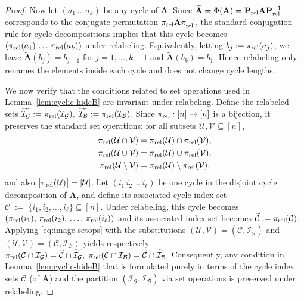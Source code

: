 \documentclass[onecolumn]{IEEEtran} %
\newcommand{\bA}{\mathbf A}
\newcommand{\bP}{\mathbf P}
\newcommand{\1}{\mathbbm{1}}
\theoremstyle{boldremark}
\begin{document}
\begin{proof}
Now let $(a_1\,\dots\,a_k)$ be any cycle of $\bA$. Since
$\widetilde{\bA}=\Phi(\bA)=\bP_{\rm rel}\bA\bP_{\rm rel}^{-1}$ corresponds to the
conjugate permutation $\pi_{\rm rel}\bA\pi_{\rm rel}^{-1}$, the standard
conjugation rule for cycle decompositions \cite[Proposition~10, p.~125]{DummitFoote2004}
implies that this cycle becomes
$(\pi_{\rm rel}(a_1)\,\dots\,\pi_{\rm rel}(a_k))$ under relabeling. Equivalently,
letting $b_j:=\pi_{\rm rel}(a_j)$, we have
$\widetilde{\bA}(b_j)=b_{j+1}$ for $j=1,\dots,k-1$ and $\widetilde{\bA}(b_k)=b_1$.
Hence relabeling only renames the elements inside each cycle and does not change
cycle lengths.


We now verify that the conditions related to set operations used in Lemma~\ref{lem:cyclic-hideB}
are invariant under relabeling. Define the relabeled sets $\widetilde{\mathcal{I}_{\mathcal{G}}}:=\pi_{\rm rel}(\mathcal{I}_{\mathcal{G}}),\;\widetilde{\mathcal{I}_{\mathcal{B}}}:=\pi_{\rm rel}(\mathcal{I}_{\mathcal{B}}).$ Since $\pi_{\rm rel}:[n]\to[n]$ is a bijection, it preserves the standard set
operations: for all subsets $\mathcal{U},\mathcal{V}\subseteq[n]$,
\begin{align}\label{eq:image-setops}
\pi_{\rm rel}(\mathcal{U}\cap \mathcal{V})&=\pi_{\rm rel}(\mathcal{U})\cap \pi_{\rm rel}(\mathcal{V}),\\
\pi_{\rm rel}(\mathcal{U}\cup \mathcal{V})&=\pi_{\rm rel}(\mathcal{U})\cup \pi_{\rm rel}(\mathcal{V}),\\
\pi_{\rm rel}(\mathcal{U}\setminus \mathcal{V})&=\pi_{\rm rel}(\mathcal{U})\setminus \pi_{\rm rel}(\mathcal{V}),
\end{align}
and also $\bigl|\pi_{\rm rel}(\mathcal{U})\bigr|=|\mathcal{U}|$. Let $(i_1\,i_2\,\dots\,i_\ell)$ be one cycle in the disjoint cycle decomposition
of $\bA$, and define its associated cycle index set
$ \mathcal{C}\;:=\;\{i_1,i_2,\dots,i_\ell\}\subseteq[n].$
Under relabeling, this cycle becomes
$(\pi_{\rm rel}(i_1),\,\pi_{\rm rel}(i_2),\,\dots,\,\pi_{\rm rel}(i_\ell))$ and its
associated index set becomes $\widetilde{\mathcal{C}}:=\pi_{\rm rel}(\mathcal{C})$.
Applying \eqref{eq:image-setops} with the substitutions $(\mathcal{U},\mathcal{V})=(\mathcal{C},\mathcal{I}_{\mathcal{G}})$
and $(\mathcal{U},\mathcal{V})=(\mathcal{C},\mathcal{I}_{\mathcal{B}})$ yields respectively
$\pi_{\rm rel}(\mathcal{C}\cap\mathcal{I}_{\mathcal{G}})=\widetilde{\mathcal{C}}\cap\widetilde{\mathcal{I}_{\mathcal{G}}},
\; \pi_{\rm rel}(\mathcal{C}\cap\mathcal{I}_{\mathcal{B}})=\widetilde{\mathcal{C}}\cap\widetilde{\mathcal{I}_{\mathcal{B}}}.$
Consequently, any condition in Lemma~\ref{lem:cyclic-hideB} that is formulated
purely in terms of the cycle index sets $\mathcal{C}$ (of $\bA$) and the
partition $(\mathcal{I}_{\mathcal{G}},\mathcal{I}_{\mathcal{B}})$ via set operations is preserved
under relabeling.


\end{proof}
\end{document}
